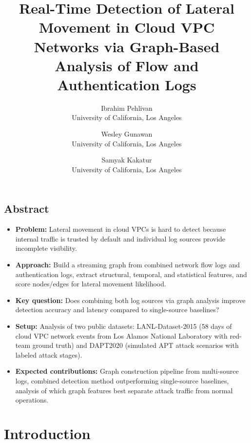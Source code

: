 \documentclass[letterpaper,twocolumn,10pt]{article}
\begin{document}
\date{}

\title{\Large \bf Real-Time Detection of Lateral Movement in Cloud VPC Networks via Graph-Based Analysis of Flow and Authentication Logs}

\author{
{\rm Ibrahim Pehlivan}\\
University of California, Los Angeles
\and
{\rm Wesley Gunawan}\\
University of California, Los Angeles
\and
{\rm Samyak Kakatur}\\
University of California, Los Angeles
}

\maketitle

\thispagestyle{empty}


\subsection*{Abstract}
\begin{itemize}
\item \textbf{Problem:} Lateral movement in cloud VPCs is hard to detect because internal traffic is trusted by default and individual log sources provide incomplete visibility.
\item \textbf{Approach:} Build a streaming graph from combined network flow logs and authentication logs, extract structural, temporal, and statistical features, and score nodes/edges for lateral movement likelihood.
\item \textbf{Key question:} Does combining both log sources via graph analysis improve detection accuracy and latency compared to single-source baselines?
\item \textbf{Setup:} Analysis of two public datasets: LANL-Dataset-2015 (58 days of cloud VPC network events from Los Alamos National Laboratory with red-team ground truth) and DAPT2020 (simulated APT attack scenarios with labeled attack stages).
\item \textbf{Expected contributions:} Graph construction pipeline from multi-source logs, combined detection method outperforming single-source baselines, analysis of which graph features best separate attack traffic from normal operations.
\end{itemize}

\section{Introduction}
\end{document}

